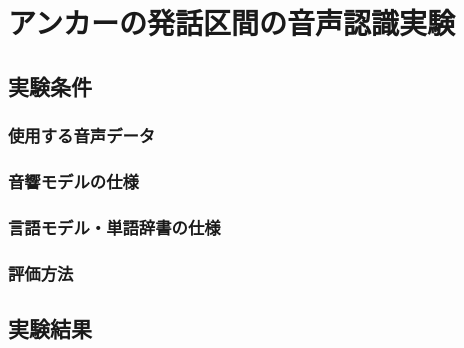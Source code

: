 \chapter{アンカーの発話区間の音声認識実験}
\section{実験条件}
\subsection{使用する音声データ}
\subsection{音響モデルの仕様}
\subsection{言語モデル・単語辞書の仕様}
\subsection{評価方法}
\section{実験結果}
